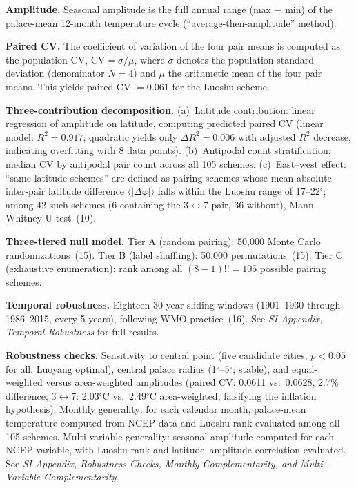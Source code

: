\documentclass[9pt,twocolumn]{article}
\begin{document}
\textbf{Amplitude.} Seasonal amplitude is the full annual range (max $-$ min) of the palace-mean 12-month temperature cycle (``average-then-amplitude'' method).

\textbf{Paired CV.} The coefficient of variation of the four pair means is computed as the population CV, $\mathrm{CV} = \sigma/\mu$, where $\sigma$ denotes the population standard deviation (denominator $N = 4$) and $\mu$ the arithmetic mean of the four pair means. This yields paired CV $= 0.061$ for the Luoshu scheme.

\textbf{Three-contribution decomposition.} (a)~Latitude contribution: linear regression of amplitude on latitude, computing predicted paired CV (linear model: $R^2 = 0.917$; quadratic yields only $\Delta R^2 = 0.006$ with adjusted $R^2$ decrease, indicating overfitting with 8 data points). (b)~Antipodal count stratification: median CV by antipodal pair count across all 105 schemes. (c)~East--west effect: ``same-latitude schemes'' are defined as pairing schemes whose mean absolute inter-pair latitude difference $\langle|\Delta\varphi|\rangle$ falls within the Luoshu range of 17--22$^\circ$; among 42 such schemes (6 containing the 3$\leftrightarrow$7 pair, 36 without), Mann--Whitney U test~(10).

\textbf{Three-tiered null model.} Tier A (random pairing): 50,000 Monte Carlo randomizations~(15). Tier B (label shuffling): 50,000 permutations~(15). Tier C (exhaustive enumeration): rank among all $(8-1)!! = 105$ possible pairing schemes.

\textbf{Temporal robustness.} Eighteen 30-year sliding windows (1901--1930 through 1986--2015, every 5 years), following WMO practice~(16). See \textit{SI Appendix, Temporal Robustness} for full results.

\textbf{Robustness checks.} Sensitivity to central point (five candidate cities; $p < 0.05$ for all, Luoyang optimal), central palace radius (1$^\circ$--5$^\circ$; stable), and equal-weighted versus area-weighted amplitudes (paired CV: 0.0611 vs.\ 0.0628, 2.7\% difference; 3$\leftrightarrow$7: 2.03$^\circ$C vs.\ 2.49$^\circ$C area-weighted, falsifying the inflation hypothesis). Monthly generality: for each calendar month, palace-mean temperature computed from NCEP data and Luoshu rank evaluated among all 105 schemes. Multi-variable generality: seasonal amplitude computed for each NCEP variable, with Luoshu rank and latitude--amplitude correlation evaluated. See \textit{SI Appendix, Robustness Checks, Monthly Complementarity, and Multi-Variable Complementarity}.
\end{document}
